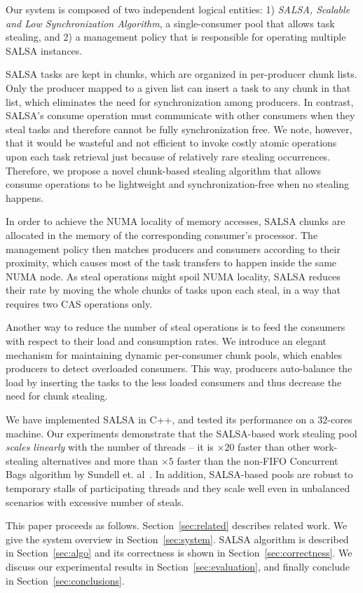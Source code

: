 Our system is composed of two independent logical entities: 1) \emph{SALSA, Scalable and Low Synchronization Algorithm}, a single-consumer pool that allows task stealing, and 2) a management policy that is responsible for operating multiple SALSA instances. 

SALSA tasks are kept in chunks, which are organized in per-producer chunk lists. Only the producer mapped to a given list can insert
a task to any chunk in that list, which eliminates the need for synchronization among producers. In contrast, SALSA's consume operation must communicate with other consumers when they steal tasks and therefore cannot be fully synchronization free.
We note, however, that it would be wasteful and not efficient to invoke costly atomic operations upon each task retrieval just because of relatively rare stealing occurrences. 
Therefore, we propose a novel chunk-based stealing algorithm that allows consume operations to be lightweight and synchronization-free when no stealing happens. 

In order to achieve the NUMA locality of memory accesses, SALSA chunks are allocated in the memory of the corresponding consumer's processor. 
The management policy then matches producers and consumers according to their proximity, which causes most of the task transfers to happen inside the same NUMA node. As steal operations might spoil NUMA locality, SALSA reduces their rate by moving the whole chunks of tasks upon each steal, in a way that requires two CAS operations only.  

Another way to reduce the number of steal operations is to feed the consumers with respect to their load and consumption rates.
We introduce an elegant mechanism for maintaining dynamic per-consumer chunk pools, which enables producers to detect overloaded consumers. This way, producers auto-balance the load by inserting the tasks to the less loaded consumers and thus decrease the need for chunk stealing.

We have implemented SALSA in C++, and tested its performance on a $32$-cores machine. Our experiments demonstrate that the SALSA-based work stealing pool \emph{scales linearly} with the number of threads -- it is $\times20$ faster than other work-stealing alternatives and more than $\times5$ faster than the non-FIFO Concurrent Bags algorithm by Sundell et. al~\cite{Sundell:2011:LAC:1989493.1989550}. In addition, SALSA-based pools are robust to temporary stalls of participating threads and they scale well even in unbalanced scenarios with excessive number of steals. 

This paper proceeds as follows. Section~\ref{sec:related} describes related work. We give the system overview in Section~\ref{sec:system}. SALSA algorithm is described in Section~\ref{sec:algo} and its correctness is shown in Section~\ref{sec:correctness}. We discuss our experimental results in Section~\ref{sec:evaluation}, and finally conclude in Section~\ref{sec:conclusions}.
